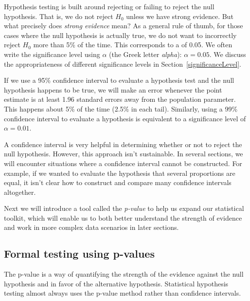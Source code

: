 Hypothesis testing is built around rejecting or failing
to reject the null hypothesis.
That is, we do not reject $H_0$ unless we have strong evidence.
But what precisely does \emph{strong evidence} mean?
As a general rule of thumb, for those cases where the null
hypothesis is actually true, we do not want to incorrectly
reject $H_0$ more than 5\% of the time.
This corresponds to a
of 0.05.
We often write the significance level using $\alpha$
(the Greek letter \emph{alpha}):
$\alpha = 0.05$.
We discuss the appropriateness of different significance
levels in Section~\ref{significanceLevel}.

If we use a 95\% confidence interval to evaluate a
hypothesis test and the null hypothesis happens to be true,
we will make an error whenever the point estimate is
at least 1.96 standard errors away from the population
parameter.
This happens about 5\% of the time (2.5\% in each tail).
Similarly, using a 99\% confidence interval to evaluate
a hypothesis is equivalent to a significance level of
$\alpha = 0.01$.

A confidence interval is very helpful in determining
whether or not to reject the null hypothesis.
However, this approach isn't sustainable.
In several sections, we will encounter situations where
a confidence interval cannot be constructed.
For example, if we wanted to evaluate the hypothesis
that several proportions are equal, it isn't clear how
to construct and compare many confidence intervals
altogether.

Next we will introduce a tool called the \emph{p-value}
to help us expand our statistical toolkit, which will
enable us to both better understand the strength of
evidence and work in more complex data scenarios in
later sections.



\subsection{Formal testing using p-values}

\label{pValue}


The p-value is a way of quantifying the strength of the
evidence against the null hypothesis and in favor of the
alternative hypothesis.
Statistical hypothesis testing almost always uses the
p-value method rather than confidence intervals.

